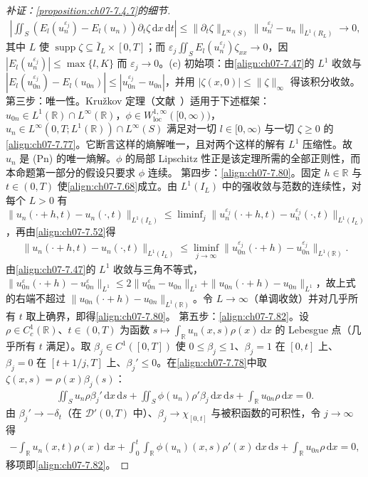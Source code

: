 ﻿\documentclass[../../main.tex]{subfiles}%
\begin{document}
\begin{proof}[补证：\cref{proposition:ch07-7.4.7}的细节]
\begin{align*}
\left|\iint_S(E_l(u_n^{\varepsilon_j})-E_l(u_n))\partial_t\zeta\,\mathrm{d}x\,\mathrm{d}t\right|
\leqslant\|\partial_t\zeta\|_{L^\infty(S)}\|u_n^{\varepsilon_j}-u_n\|_{L^1(R_L)}\to0,
\end{align*}
其中 $L$ 使 $\operatorname{supp}\zeta\subseteq\bar I_L\times[0,T]$；而 $\varepsilon_j\iint_SE_l(u_n^{\varepsilon_j})\zeta_{xx}\to0$，因 $|E_l(u_n^{\varepsilon_j})|\leqslant\max\{l,K\}$ 而 $\varepsilon_j\to0$。(c) 初始项：由\eqref{align:ch07-7.47}的 $L^1$ 收敛与 $|E_l(u_{0n}^{\varepsilon_j})-E_l(u_{0n})|\leqslant|u_{0n}^{\varepsilon_j}-u_{0n}|$，并用 $|\zeta(x,0)|\leqslant\|\zeta\|_\infty$ 得该积分收敛。
第三步：唯一性。Kružkov 定理（文献~\cite{ref91}）适用于下述框架：$u_{0n}\in L^1(\mathbb{R})\cap L^\infty(\mathbb{R})$，$\phi\in W^{1,\infty}_{\mathrm{loc}}([0,\infty))$，$u_n\in L^\infty(0,T;L^1(\mathbb{R}))\cap L^\infty(S)$ 满足对一切 $l\in[0,\infty)$ 与一切 $\zeta\geqslant0$ 的\eqref{align:ch07-7.77}。它断言这样的熵解唯一，且对两个这样的解有 $L^1$ 压缩性。故 $u_n$ 是 (Pn) 的唯一熵解。$\phi$ 的局部 Lipschitz 性正是该定理所需的全部正则性，而本命题第一部分的假设只要求 $\phi$ 连续。
第四步：\eqref{align:ch07-7.80}。固定 $h\in\mathbb{R}$ 与 $t\in(0,T)$ 使\eqref{align:ch07-7.68}成立。由 $L^1(I_L)$ 中的强收敛与范数的连续性，对每个 $L>0$ 有 $\|u_n(\cdot+h,t)-u_n(\cdot,t)\|_{L^1(I_L)}\leqslant\liminf_j\|u_n^{\varepsilon_j}(\cdot+h,t)-u_n^{\varepsilon_j}(\cdot,t)\|_{L^1(I_L)}$，再由\eqref{align:ch07-7.52}得
\begin{align*}
\|u_n(\cdot+h,t)-u_n(\cdot,t)\|_{L^1(I_L)}\leqslant\liminf_{j\to\infty}\|u_{0n}^{\varepsilon_j}(\cdot+h)-u_{0n}^{\varepsilon_j}\|_{L^1(\mathbb{R})}.
\end{align*}
由\eqref{align:ch07-7.47}的 $L^1$ 收敛与三角不等式，$\|u_{0n}^{\varepsilon}(\cdot+h)-u_{0n}^{\varepsilon}\|_{L^1}\leqslant2\|u_{0n}^\varepsilon-u_{0n}\|_{L^1}+\|u_{0n}(\cdot+h)-u_{0n}\|_{L^1}$，故上式的右端不超过 $\|u_{0n}(\cdot+h)-u_{0n}\|_{L^1(\mathbb{R})}$。令 $L\to\infty$（单调收敛）并对几乎所有 $t$ 取上确界，即得\eqref{align:ch07-7.80}。
第五步：\eqref{align:ch07-7.82}。设 $\rho\in C^1_c(\mathbb{R})$、$t\in(0,T)$ 为函数 $s\mapsto\int_{\mathbb{R}}u_n(x,s)\rho(x)\,\mathrm{d}x$ 的 Lebesgue 点（几乎所有 $t$ 满足）。取 $\beta_j\in C^1([0,T])$ 使 $0\leqslant\beta_j\leqslant1$、$\beta_j=1$ 在 $[0,t]$ 上、$\beta_j=0$ 在 $[t+1/j,T]$ 上、$\beta_j'\leqslant0$。在\eqref{align:ch07-7.78}中取 $\zeta(x,s)=\rho(x)\beta_j(s)$：
\begin{align*}
\iint_Su_n\rho\beta_j'\,\mathrm{d}x\,\mathrm{d}s+\iint_S\phi(u_n)\rho'\beta_j\,\mathrm{d}x\,\mathrm{d}s+\int_{\mathbb{R}}u_{0n}\rho\,\mathrm{d}x=0.
\end{align*}
由 $\beta_j'\to-\delta_t$（在 $\mathscr{D}'(0,T)$ 中）、$\beta_j\to\chi_{[0,t]}$ 与被积函数的可积性，令 $j\to\infty$ 得
\begin{align*}
-\int_{\mathbb{R}}u_n(x,t)\rho(x)\,\mathrm{d}x+\int_0^t\int_{\mathbb{R}}\phi(u_n)(x,s)\rho'(x)\,\mathrm{d}x\,\mathrm{d}s+\int_{\mathbb{R}}u_{0n}\rho\,\mathrm{d}x=0,
\end{align*}
移项即\eqref{align:ch07-7.82}。
\end{proof}
\end{document}
